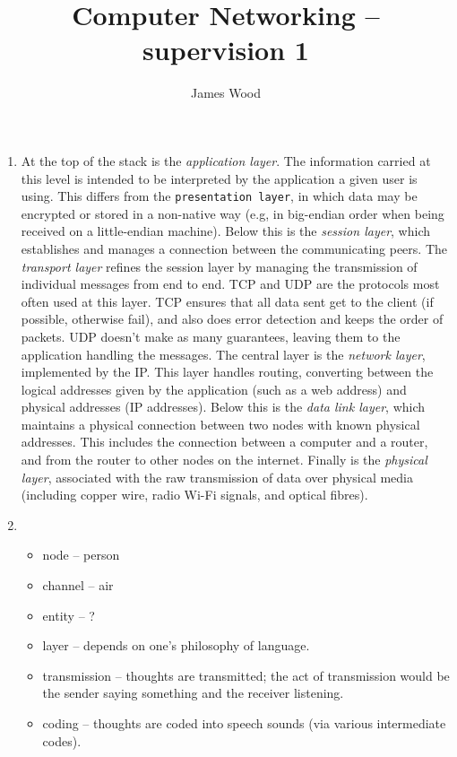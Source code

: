 \documentclass{article}
\begin{document}
\title{Computer Networking -- supervision 1}
\author{James Wood}
\maketitle

\begin{enumerate}
  \item At the top of the stack is the \textit{application layer}. The information carried at this level is intended to be interpreted by the application a given user is using. This differs from the \texttt{presentation layer}, in which data may be encrypted or stored in a non-native way (e.g, in big-endian order when being received on a little-endian machine). Below this is the \textit{session layer}, which establishes and manages a connection between the communicating peers. The \textit{transport layer} refines the session layer by managing the transmission of individual messages from end to end. TCP and UDP are the protocols most often used at this layer. TCP ensures that all data sent get to the client (if possible, otherwise fail), and also does error detection and keeps the order of packets. UDP doesn't make as many guarantees, leaving them to the application handling the messages. The central layer is the \textit{network layer}, implemented by the IP. This layer handles routing, converting between the logical addresses given by the application (such as a web address) and physical addresses (IP addresses). Below this is the \textit{data link layer}, which maintains a physical connection between two nodes with known physical addresses. This includes the connection between a computer and a router, and from the router to other nodes on the internet. Finally is the \textit{physical layer}, associated with the raw transmission of data over physical media (including copper wire, radio Wi-Fi signals, and optical fibres).
  \item
    \begin{itemize}
      \item node -- person
      \item channel -- air
      \item entity -- ?
      \item layer -- depends on one's philosophy of language.
      \item transmission -- thoughts are transmitted; the act of transmission would be the sender saying something and the receiver listening.
      \item coding -- thoughts are coded into speech sounds (via various intermediate codes).

\end{itemize}
\end{enumerate}
\end{document}
